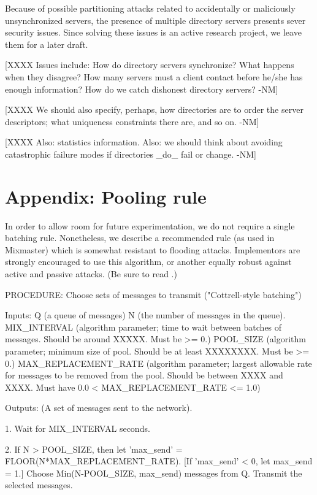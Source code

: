 Because of possible partitioning attacks related to accidentally or
maliciously unsynchronized servers, the presence of multiple directory
servers presents sever security issues.  Since solving these issues is
an active research project, we leave them for a later draft.


[XXXX Issues include:  How do directory servers synchronize?
   What happens when they disagree?  How many servers must a client
   contact before he/she has enough information?  How do we catch
   dishonest directory servers? -NM]

[XXXX We should also specify, perhaps, how directories are to order
   the server descriptors; what uniqueness constraints there are, and so
   on. -NM]

[XXXX Also: statistics information. Also: we should think about
   avoiding catastrophic failure modes if directories _do_ fail or
   change. -NM]

\section{Appendix: Pooling rule}

In order to allow room for future experimentation, we do not require a
single batching rule.  Nonetheless, we describe a recommended rule (as
used in Mixmaster) which is somewhat resistant to flooding attacks.
Implementors are strongly encouraged to use this algorithm, or another
equally robust against active and passive attacks.  (Be sure to read
\cite{batching-taxonomy}.)

PROCEDURE: Choose sets of messages to transmit ("Cottrell-style batching")

Inputs: Q (a queue of messages)
        N (the number of messages in the queue).
        MIX_INTERVAL (algorithm parameter; time to wait between
                      batches of messages.  Should be around
                      XXXXX. Must be >= 0.)
        POOL_SIZE (algorithm parameter; minimum size of pool.  Should
                   be at least XXXXXXXX.  Must be >= 0.)
        MAX_REPLACEMENT_RATE (algorithm parameter; largest allowable
                   rate for messages to be removed from the
                   pool. Should be between XXXX and XXXX.  Must have
                   0.0 < MAX_REPLACEMENT_RATE <= 1.0)

Outputs: (A set of messages sent to the network).

1. Wait for MIX_INTERVAL seconds.

2. If N > POOL_SIZE, then let 'max_send' = FLOOR(N*MAX_REPLACEMENT_RATE).
   [If 'max_send' < 0, let max_send = 1.]  Choose Min(N-POOL_SIZE, max_send)
   messages from Q.  Transmit the selected messages.

